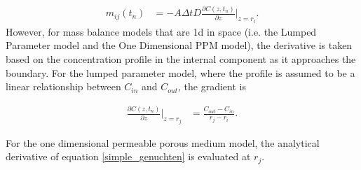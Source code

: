 \begin{align}
m_{ij}(t_n) &= - A\Delta t D \frac{\partial C(z,t_n)}{\partial z}|_{z=r_i}.
\end{align}
However, for mass balance models that are 1d in space (i.e. the Lumped Parameter model 
and the One Dimensional PPM model), the derivative is taken based on the 
concentration profile in the internal component as it approaches the boundary. 
For the lumped parameter model, where the profile is assumed to be a linear 
relationship between $C_{in}$ and $C_{out}$, the gradient is

\begin{align} 
\frac{\partial C(z,t_n)}{\partial z}\Bigg|_{z=r_j} &= \frac{C_{out} - C_{in}}{r_{j} - r_{i}}.
\end{align}

For the one dimensional permeable porous medium model, the analytical 
derivative of equation \eqref{simple_genuchten} is evaluated at $r_j$.


